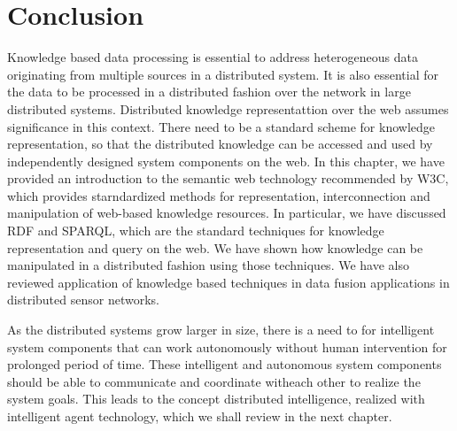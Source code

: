 \section{Conclusion}

Knowledge based data processing is essential to address heterogeneous data originating from multiple sources in a distributed
system. It is also essential for the data to be processed in a distributed fashion over the network in large distributed 
systems. Distributed knowledge representattion over the web assumes significance in this context. There need to be a standard
scheme for knowledge representation, so that the distributed knowledge can be accessed and used by independently designed 
system components on the web. 
%
In this chapter, we have provided an introduction to the semantic web technology recommended by W3C, which provides starndardized 
methods for representation, interconnection and manipulation of web-based knowledge resources. In particular, we have discussed
RDF and SPARQL, which are the standard techniques for knowledge representation and query on the web. We have shown how knowledge
can be manipulated in a distributed fashion using those techniques. We have also reviewed application of knowledge based techniques  
in data fusion applications in distributed sensor networks.

As the distributed systems grow larger in size, there is a need to for intelligent system components that can work autonomously
without human intervention for prolonged period of time. These intelligent and autonomous system components should be able to
communicate and coordinate witheach other to realize the system goals. This leads to the concept distributed intelligence, realized 
with intelligent agent technology, which we shall review in the next chapter.


